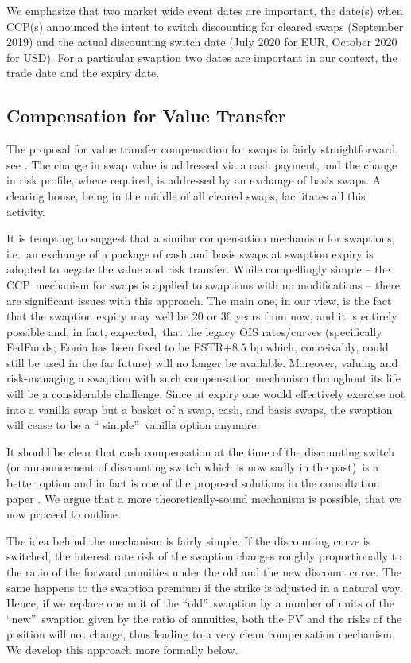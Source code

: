 \documentclass{article}
\begin{document}
We emphasize that two market wide event dates are important, the date(s)
when CCP(s) announced the intent to switch discounting for cleared swaps
(September 2019) and the actual discounting switch date (July 2020 for EUR,
October 2020 for USD). For a particular swaption two dates are important in
our context, the trade date and the expiry date.

\subsection{Compensation for Value Transfer\label{sec:swpt_comp}}

The proposal for value transfer compensation for swaps is fairly
straightforward, see \cite{cme-ds}. The change in swap value is addressed
via a cash payment, and the change in risk profile, where required, is
addressed by an exchange of basis swaps. A clearing house, being in the
middle of all cleared swaps, facilitates all this activity.

It is tempting to suggest that a similar compensation mechanism for
swaptions, i.e.\ an exchange of a package of cash and basis swaps at
swaption expiry is adopted to negate the value and risk transfer. While
compellingly simple -- the CCP\ mechanism for swaps is applied to swaptions
with no modifications -- there are significant issues with this approach.
The main one, in our view, is the fact that the swaption expiry may well be
20 or 30 years from now, and it is entirely possible and, in fact,
expected,\ that the legacy OIS rates/curves (specifically FedFunds; Eonia
has been fixed to be ESTR$+8.5$ bp which, conceivably, could still be used
in the far future) will no longer be available. Moreover, valuing and
risk-managing a swaption with such compensation mechanism throughout its
life will be a considerable challenge. Since at expiry one would effectively
exercise not into a vanilla swap but a basket of a swap, cash, and basis
swaps, the swaption will cease to be a \textquotedblleft
simple\textquotedblright\ vanilla option anymore.

It should be clear that cash compensation at the time of the discounting
switch (or announcement of discounting switch which is now sadly in the
past)\ is a better option and in fact is one of the proposed solutions in
the consultation paper \cite{arrc}. We argue that a more theoretically-sound
mechanism is possible, that we now proceed to outline.

The idea behind the mechanism is fairly simple. If the discounting curve is
switched, the interest rate risk of the swaption changes roughly
proportionally to the ratio of the forward annuities under the old and the
new discount curve. The same happens to the swaption premium if the strike
is adjusted in a natural way. Hence, if we replace one unit of the
\textquotedblleft old\textquotedblright\ swaption by a number of units of
the \textquotedblleft new\textquotedblright\ swaption given by the ratio of
annuities, both the PV and the risks of the position will not change, thus
leading to a very clean compensation mechanism. We develop this approach
more formally below. 
\end{document}
